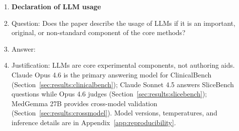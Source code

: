 \begin{enumerate}
\item {\bf Declaration of LLM usage}
    \item[] Question: Does the paper describe the usage of LLMs if it is an important, original, or non-standard component of the core methods?
    \item[] Answer: \answerYes{}
    \item[] Justification: LLMs are core experimental components, not authoring aids. Claude Opus 4.6 is the primary answering model for ClinicalBench (Section~\ref{sec:results:clinicalbench}); Claude Sonnet 4.5 answers SliceBench questions while Opus 4.6 judges (Section~\ref{sec:results:slicebench}); MedGemma 27B provides cross-model validation (Section~\ref{sec:results:crossmodel}). Model versions, temperatures, and inference details are in Appendix~\ref{app:reproducibility}.

\end{enumerate}
